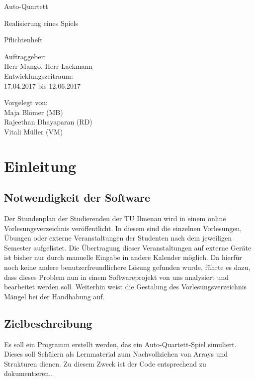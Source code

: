 \documentclass[11pt]{scrreprt}
\begin{document}
\begin{center}
\Huge
Auto-Quartett

\medskip
\large
Realisierung eines Spiels 

\vskip 1in
\Huge
Pflichtenheft

\large
\vskip 2in
Auftraggeber:\\
Herr Mango, Herr Lackmann\\
Entwicklungszeitraum:\\
17.04.2017 bis 12.06.2017

\large
\vskip 2in
Vorgelegt von:\\
Maja Blömer (MB)\\
Rajeethan Dhayaparan (RD)\\
Vitali Müller (VM)

\end{center}

\newpage
\tableofcontents

\newpage
\chapter{Einleitung}

\section{Notwendigkeit der Software}
\normalsize \normalfont \textnormal
Der Stundenplan der Studierenden der TU Ilmenau wird in einem online Vorlesungsverzeichnis veröffentlicht. In diesem sind die einzelnen Vorlesungen, Übungen oder externe Veranstaltungen der Studenten nach dem jeweiligen Semester aufgelistet. Die Übertragung dieser Veranstaltungen auf externe Geräte ist bisher nur durch manuelle Eingabe in andere Kalender möglich. Da hierfür noch keine andere benutzerfreundlichere Lösung gefunden wurde, führte es dazu, dass dieses Problem nun in einem Softwareprojekt von uns analysiert und bearbeitet werden soll. Weiterhin weist die Gestalung des Vorlesungsverzeichnis Mängel bei der Handhabung auf.

\section{Zielbeschreibung}
Es soll ein Programm erstellt werden, das ein Auto-Quartett-Spiel simuliert. Dieses soll Schülern als Lernmaterial zum Nachvollziehen von Arrays und Strukturen dienen. Zu diesem Zweck ist der Code entsprechend zu dokumentieren..


\newpage
\end{document}
